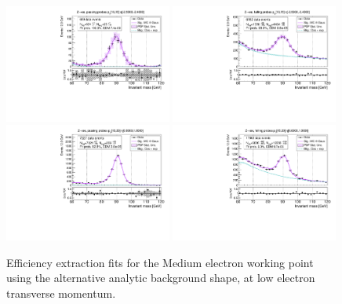 {\begin{figure}
\centering
\includegraphics[width=0.49\textwidth]{figures/Zee_RecoTemplate_BkgAnalytic_pass_ptBin0_etaBin0.pdf}
\includegraphics[width=0.49\textwidth]{figures/Zee_RecoTemplate_BkgAnalytic_fail_ptBin0_etaBin0.pdf}
\includegraphics[width=0.49\textwidth]{figures/Zee_RecoTemplate_BkgAnalytic_pass_ptBin1_etaBin19.pdf}
\includegraphics[width=0.49\textwidth]{figures/Zee_RecoTemplate_BkgAnalytic_fail_ptBin1_etaBin19.pdf}
\caption{Efficiency extraction fits for the Medium electron working point using the alternative analytic background shape, at low electron transverse momentum.}
\label{fig:ZeeAltBkgFits1}
\end{figure}

}
